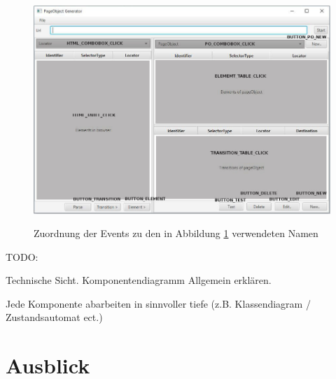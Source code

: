 \begin{figure}[htb]
  \centering  
  \includegraphics[scale=0.46]{img/poGeneratorEvents.jpg}\\
  \caption{Zuordnung der Events zu den in Abbildung \ref{fig:state_mashine} verwendeten Namen}
  \label{fig:state_mashine}
\end{figure}

\newpage
TODO: 

Technische Sicht. 
Komponentendiagramm Allgemein erklären.

Jede Komponente abarbeiten in sinnvoller tiefe (z.B. Klassendiagram / Zustandsautomat ect.)











\section{Ausblick}

